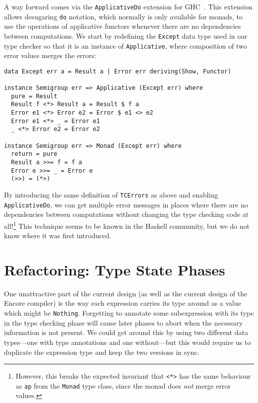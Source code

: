 \documentclass[sigplan,screen]{acmart}
\makeatletter
\newcommand{\ec}[1]{\lstinline[style=encore,breaklines=true,basicstyle=\fontsize{9}{9}\tt]@#1@}
\makeatother
\begin{document}
A way forward comes via the \ec{ApplicativeDo} extension for
GHC~\cite{ApplicativeDo}. This extension allows desugaring \ec{do}
notation, which normally is only available for monads, to use the
operations of applicative functors whenever there are no
dependencies between computations. We start by redefining the
\ec{Except} data type used in our type checker so that it is an
instance of \ec{Applicative}, where composition of two error
values merges the errors: %

\begin{minipage}[t]{\linewidth}
\begin{lstlisting}[style=encore,numbers=none,xleftmargin=8px]
data Except err a = Result a | Error err deriving(Show, Functor)

instance Semigroup err => Applicative (Except err) where
  pure = Result
  Result f <*> Result a = Result $ f a
  Error e1 <*> Error e2 = Error $ e1 <> e2
  Error e1 <*> _ = Error e1
  _ <*> Error e2 = Error e2

instance Semigroup err => Monad (Except err) where
  return = pure
  Result a >>= f = f a
  Error e >>= _ = Error e
  (>>) = (*>)
\end{lstlisting}
\end{minipage}

By introducing the same definition of \ec{TCErrors} as above and
enabling \ec{ApplicativeDo}, we can get multiple error messages in
places where there are no dependencies between computations
without changing the type checking code at all!\footnote{However,
  this breaks the expected invariant that \ec{<*>} has the same
  behaviour as \ec{ap} from the \ec{Monad} type class, since the
  monad does \emph{not} merge error values. } This technique
seems to be known in the Haskell community, but we do not know
where it was first introduced.

%

\section{Refactoring: Type State Phases}
\label{sec:phantom}

One unattractive part of the current design (as well as the current design of the Encore compiler) is the way each
expression carries its type around as a value which might be
\ec{Nothing}. Forgetting to annotate some subexpression with its
type in the type checking phase will cause later phases to abort
when the necessary information is not present.
%
We could get around this by using two different data types---one
with type annotations and one without---but this would require us
to duplicate the expression type and keep the two versions in
sync.
\end{document}
